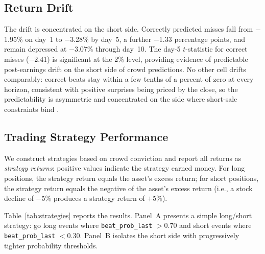 \documentclass[11pt]{article}
\begin{document}
\subsection{Return Drift}

The drift is concentrated on the short side. Correctly predicted misses fall from $-$1.95\% on day~1 to $-$3.28\% by day~5, a further $-$1.33 percentage points, and remain depressed at $-$3.07\% through day~10. The day-5 $t$-statistic for correct misses ($-$2.41) is significant at the 2\% level, providing evidence of predictable post-earnings drift on the short side of crowd predictions. No other cell drifts comparably: correct beats stay within a few tenths of a percent of zero at every horizon, consistent with positive surprises being priced by the close, so the predictability is asymmetric and concentrated on the side where short-sale constraints bind \citep{bernard1989post, shleifer1997limits}.

\subsection{Trading Strategy Performance}

We construct strategies based on crowd conviction and report all returns as \textit{strategy returns}: positive values indicate the strategy earned money. For long positions, the strategy return equals the asset's excess return; for short positions, the strategy return equals the negative of the asset's excess return (i.e., a stock decline of $-$5\% produces a strategy return of $+$5\%).

Table~\ref{tab:strategies} reports the results. Panel~A presents a simple long/short strategy: go long events where \texttt{beat\_prob\_last} $> 0.70$ and short events where \texttt{beat\_prob\_last} $< 0.30$. Panel~B isolates the short side with progressively tighter probability thresholds.
\end{document}
